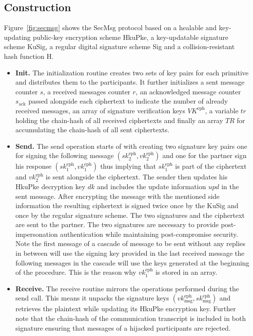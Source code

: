 \documentclass[11pt,a4paper,twoside,openright,bibliography=totoc]{scrbook}
\renewcommand{\t}{\text} %
\begin{document}
\subsection{Construction}
\label{sec:construction-3}

Figure~\ref{fig:secmsg} shows the SecMsg protocol based on a healable and key-updating
public-key encryption scheme HkuPke, a key-updatable signature scheme KuSig,
a regular digital signature scheme Sig and a collision-resistant hash function H.
\begin{itemize}
\item \textbf{Init.} The initialization routine creates two sets of key pairs
  for each primitive and distributes them to the participants. It further
  initializes a sent message counter $s$, a received messages counter $r$,
  an acknowledged message counter $s_\t{ack}$ passed alongside
  each ciphertext to indicate the number of already received messages, an array
  of signature verification keys $VK^\t{eph}$, a variable $tr$ holding the chain-hash
  of all received ciphertexts and finally an array $TR$ for accumulating
  the chain-hash of all sent ciphertexts.
\item \textbf{Send.} The send operation starts of with creating two signature
  key pairs one for signing the following message $(sk_2^\t{eph},vk_2^\t{eph})$
  and one for the partner sign his response $(sk_1^\t{eph},vk_1^\t{eph})$ thus
  implying that $sk_1^\t{eph}$ is part of the ciphertext and $vk_2^\t{eph}$ is
  sent alongside the ciphertext. The sender then updates his
  HkuPke decryption key $dk$ and includes the update information $upd$
  in the sent message. After encrypting the message with the mentioned
  side information the resulting ciphertext is signed twice once
  by the KuSig and once by the regular signature scheme. The two signatures
  and the ciphertext are sent to the partner. The two signatures are
  necessary to provide post-impersonation authentication while
  maintaining post-compromise
  security. Note the first message of a cascade of message to be sent
  without any replies in between will use the signing key provided in
  the last received message the following messages in the cascade
  will use the keys generated at the beginning of the procedure. This
  is the reason why $vk_1^\t{eph}$ is stored in an array.
\item \textbf{Receive.} The receive routine mirrors the operations performed
  during the send call. This means it unpacks the signature keys
  $(vk_\t{msg}^\t{eph},sk_\t{msg}^\t{eph})$ and retrieves the plaintext while
  updating its HkuPke encryption key. Further note that the chain-hash
  of the communication transcript is included in both signature ensuring
  that messages of a hijacked participants are rejected.
\end{itemize}
\end{document}
